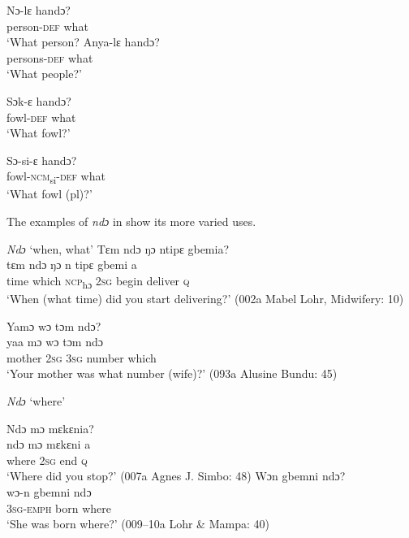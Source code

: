     \ea
    \gll Nɔ-lɛ handɔ?\\                    
    person-\textsc{def} what\\                
    \glt ‘What person?                 
    \ex
    \gll Anya-lɛ handɔ?\\
    persons-\textsc{def} what\\
    \glt ‘What people?'

    \ex
    \gll Sɔk-ɛ handɔ?\\       
    fowl-\textsc{def} what\\
    \glt ‘What fowl?'                    

    \ex
    \gll Sɔ-si-ɛ handɔ?\\
    fowl-\textsc{ncm}\textsubscript{si}{}-\textsc{def} what\\
    \glt ‘What fowl (pl)?'
    
    \z
    \z

The examples of \textit{ndɔ} in  show its more varied uses.

\newpage

\ea%
    \label{ex:64}
   \textit{Ndɔ} ‘when, what'
    \ea
    \label{ex:64a}Tɛm ndɔ ŋɔ ntipɛ   gbemia?\\
    \gll tɛm  ndɔ    ŋɔ      n    tipɛ    gbemi  a\\
    time  which  \textsc{ncp}\textsubscript{hɔ}    \textsc{2sg}  begin    deliver  \textsc{q}\\
    \glt ‘When (what time) did you start delivering?' (002a Mabel Lohr, Midwifery: 10)

    \ex 
    \label{ex:64b}Yamɔ   wɔ tɔm ndɔ?\\
    \gll yaa    mɔ  wɔ    tɔm    ndɔ\\
    mother  \textsc{2sg}  \textsc{3sg}  number  which\\
    \glt ‘Your mother was what number (wife)?' (093a Alusine Bundu: 45)

 
    \z
    \z

\ea%
    \label{ex:65}
    \textit{Ndɔ} ‘where'

    \ea 
    \label{ex:65a} Ndɔ mɔ mɛkɛnia?\\
    \gll ndɔ    mɔ  mɛkɛni  a\\
    where  \textsc{2sg}  end    \textsc{q}\\
    \glt ‘Where did you stop?'\footnotemark{} (007a Agnes J. Simbo: 48)
    \ex
    \label{ex:65b}Wɔn gbemni ndɔ?\\
    \gll wɔ{}-n      gbemni  ndɔ\\
    \textsc{3sg}{}-\textsc{emph}  born    where\\
    \glt ‘She was born where?' (009--10a Lohr \& Mampa: 40)    
    \z
    \z

